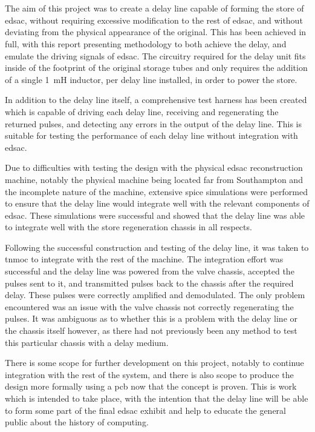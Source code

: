 \chapter{} \label{sec:conclusion}

The aim of this project was to create a delay line capable of forming the store of \gls{edsac}, without requiring excessive modification to the rest of \gls{edsac}, and without deviating from the physical appearance of the original. This has been achieved in full, with this report presenting methodology to both achieve the delay, and emulate the driving signals of \gls{edsac}. The circuitry required for the delay unit fits inside of the footprint of the original storage tubes and only requires the addition of a single \SI{1}{\milli\henry} inductor, per delay line installed, in order to power the store.

In addition to the delay line itself, a comprehensive test harness has been created which is capable of driving each delay line, receiving and regenerating the returned pulses, and detecting any errors in the output of the delay line. This is suitable for testing the performance of each delay line without integration with \gls{edsac}.

Due to difficulties with testing the design with the physical \gls{edsac} reconstruction machine, notably the physical machine being located far from Southampton and the incomplete nature of the machine, extensive \gls{spice} simulations were performed to ensure that the delay line would integrate well with the relevant components of \gls{edsac}. These simulations were successful and showed that the delay line was able to integrate well with the store regeneration chassis in all respects.

Following the successful construction and testing of the delay line, it was taken to \gls{tnmoc} to integrate with the rest of the machine. The integration effort was successful and the delay line was powered from the valve chassis, accepted the pulses sent to it, and transmitted pulses back to the chassis after the required delay. These pulses were correctly amplified and demodulated. The only problem encountered was an issue with the valve chassis not correctly regenerating the pulses. It was ambiguous as to whether this is a problem with the delay line or the chassis itself however, as there had not previously been any method to test this particular chassis with a delay medium.

There is some scope for further development on this project, notably to continue integration with the rest of the system, and there is also scope to produce the design more formally using a \gls{pcb} now that the concept is proven. This is work which is intended to take place, with the intention that the delay line will be able to form some part of the final \gls{edsac} exhibit and help to educate the general public about the history of computing.

